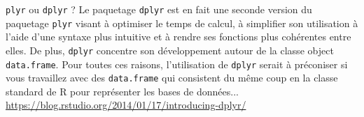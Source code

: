\begin{moreInfo}{\texttt{plyr} ou \texttt{dplyr} ?}
	Le paquetage \texttt{dplyr} est en fait une seconde version du paquetage \texttt{plyr} visant à optimiser le temps de calcul, à simplifier son utilisation à l'aide d'une syntaxe plus intuitive et à rendre ses fonctions plus cohérentes entre elles. De plus, \texttt{dplyr} concentre son développement autour de la classe object \texttt{data.frame}. Pour toutes ces raisons, l'utilisation de \texttt{dplyr} serait à préconiser si vous travaillez avec des \texttt{data.frame} qui consistent du même coup en la classe standard de R pour représenter les bases de données...\\
	\url{https://blog.rstudio.org/2014/01/17/introducing-dplyr/}
\end{moreInfo}